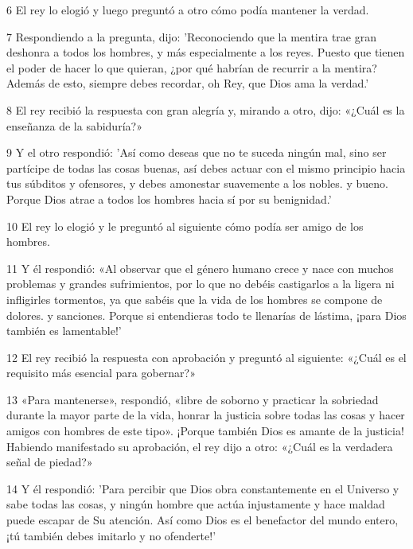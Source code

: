 \par 6 El rey lo elogió y luego preguntó a otro cómo podía mantener la verdad.

\par 7 Respondiendo a la pregunta, dijo: 'Reconociendo que la mentira trae gran deshonra a todos los hombres, y más especialmente a los reyes. Puesto que tienen el poder de hacer lo que quieran, ¿por qué habrían de recurrir a la mentira? Además de esto, siempre debes recordar, oh Rey, que Dios ama la verdad.'

\par 8 El rey recibió la respuesta con gran alegría y, mirando a otro, dijo: «¿Cuál es la enseñanza de la sabiduría?»

\par 9 Y el otro respondió: 'Así como deseas que no te suceda ningún mal, sino ser partícipe de todas las cosas buenas, así debes actuar con el mismo principio hacia tus súbditos y ofensores, y debes amonestar suavemente a los nobles. y bueno. Porque Dios atrae a todos los hombres hacia sí por su benignidad.'

\par 10 El rey lo elogió y le preguntó al siguiente cómo podía ser amigo de los hombres.

\par 11 Y él respondió: «Al observar que el género humano crece y nace con muchos problemas y grandes sufrimientos, por lo que no debéis castigarlos a la ligera ni infligirles tormentos, ya que sabéis que la vida de los hombres se compone de dolores. y sanciones. Porque si entendieras todo te llenarías de lástima, ¡para Dios también es lamentable!'

\par 12 El rey recibió la respuesta con aprobación y preguntó al siguiente: «¿Cuál es el requisito más esencial para gobernar?»

\par 13 «Para mantenerse», respondió, «libre de soborno y practicar la sobriedad durante la mayor parte de la vida, honrar la justicia sobre todas las cosas y hacer amigos con hombres de este tipo». ¡Porque también Dios es amante de la justicia! Habiendo manifestado su aprobación, el rey dijo a otro: «¿Cuál es la verdadera señal de piedad?»

\par 14 Y él respondió: 'Para percibir que Dios obra constantemente en el Universo y sabe todas las cosas, y ningún hombre que actúa injustamente y hace maldad puede escapar de Su atención. Así como Dios es el benefactor del mundo entero, ¡tú también debes imitarlo y no ofenderte!'

